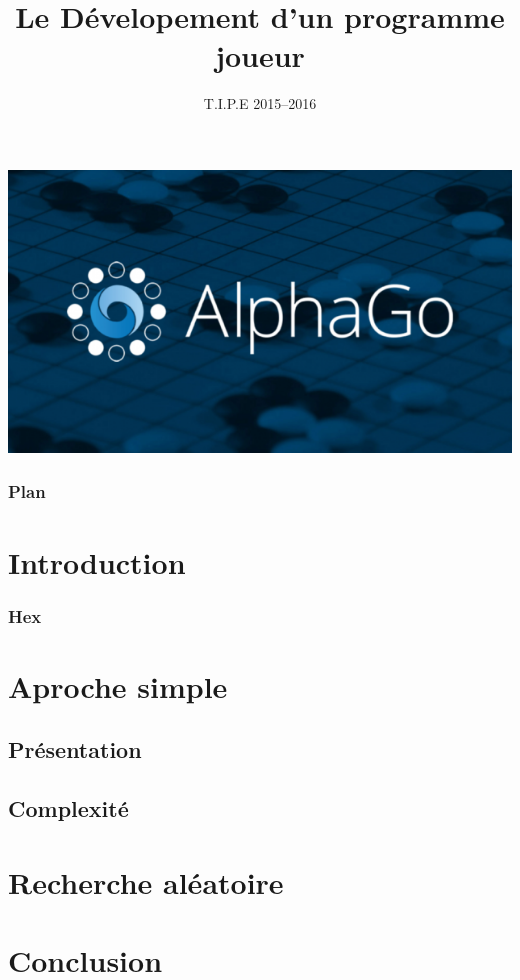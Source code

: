 \documentclass{beamer}
\title[Hex]{Le Dévelopement d'un programme joueur}
\date{T.I.P.E 2015--2016}
\begin{document}
\begin{frame}
  \titlepage
\end{frame}

\begin{frame}
  \includegraphics[scale=0.5]{img/AlphaGo}
\end{frame}

\begin{frame}
  \frametitle{Plan}
  \tableofcontents[hideallsubsections]
\end{frame}

\section{Introduction}

\begin{frame}
  \frametitle{Hex}
  \begin{HexBoard}[board size=10]
  \end{HexBoard}
\end{frame}

\section{Aproche simple}

\subsection{Présentation}


\subsection{Complexité}


\section{Recherche aléatoire}



\section{Conclusion}

\end{document}
